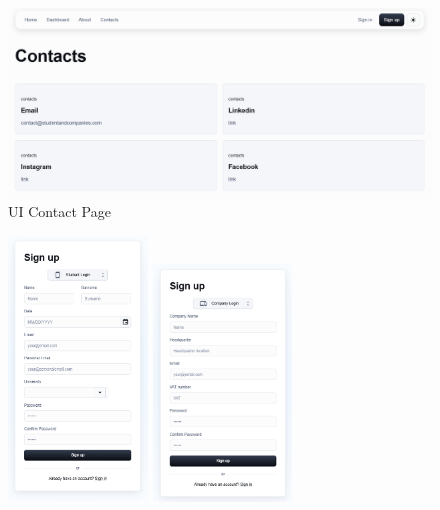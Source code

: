 \begin{figure}[H]
    \centering
    \includegraphics[width=\textwidth]{Latex/Images/ContactPage.png}
    \caption{UI Contact Page}
    \label{fig:contactpage}
\end{figure}
\begin{figure}[H]
    \includegraphics[width=0.33\textwidth]{Latex/Images/StudentSignUp.png}
    \includegraphics[width=0.33\textwidth]{Latex/Images/CompanySignUp.png}

\end{figure}
